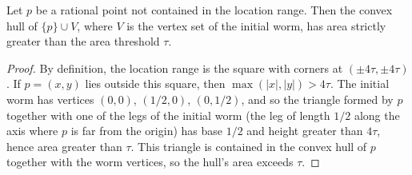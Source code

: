 \begin{theorem}
    \label{thm:area_hull_initialWorm_insert_gt_areaThreshold}
    Let $p$ be a rational point not contained in the location range.
    Then the convex hull of $\{p\} \cup V$, where $V$ is the vertex set
    of the initial worm, has area strictly greater than the area
    threshold $\tau$.
\end{theorem}
\begin{proof}
    By definition, the location range is the square with corners at
    $(\pm 4\tau, \pm 4\tau)$. If $p = (x, y)$ lies outside this square,
    then $\max(|x|, |y|) > 4\tau$. The initial worm has vertices
    $(0,0)$, $(1/2, 0)$, $(0, 1/2)$, and so the triangle formed by $p$
    together with one of the legs of the initial worm (the leg of
    length $1/2$ along the axis where $p$ is far from the origin) has
    base $1/2$ and height greater than $4\tau$, hence area greater
    than $\tau$. This triangle is contained in the convex hull of $p$
    together with the worm vertices, so the hull's area exceeds $\tau$.
\end{proof}


